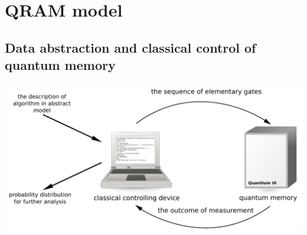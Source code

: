 \documentclass{beamer}
\begin{document}
\section{QRAM model}

\subsection{Data abstraction and classical control of quantum memory}
\begin{frame}{\insertsection}{\insertsubsection}
    \includegraphics[width=\textwidth]{pics/qram}
\end{frame}


\end{document}

